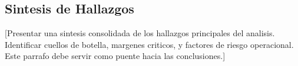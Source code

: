 \subsection{Sintesis de Hallazgos}

[Presentar una sintesis consolidada de los hallazgos principales del analisis.
Identificar cuellos de botella, margenes criticos, y factores de riesgo operacional.
Este parrafo debe servir como puente hacia las conclusiones.]

